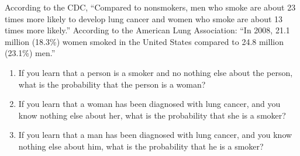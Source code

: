 \documentclass[twoside]{book}\usepackage[]{graphicx}\usepackage[]{xcolor}
\begin{document}
\begin{problem}
According to the CDC, ``Compared to nonsmokers, men who smoke are about 23
times more likely to develop lung cancer and women who smoke are about 13 times
more likely.''  According to the American Lung Association: 
``In 2008, 21.1 million (18.3\%) women smoked in the United States 
compared to 24.8 million (23.1\%) men.''

\begin{enumerate}
	\item
		If you learn that a person is a smoker and no nothing else 
		about the person, what is the probability that the person is a woman?
	\item
		If you learn that a woman has been diagnosed with lung cancer,
		and you know nothing else about her, what is the probability that she is a
		smoker?
	\item
		If you learn that a man has been diagnosed with lung cancer,
		and you know nothing else about him, what is the probability that he is a
		smoker?
\end{enumerate}
\end{problem}
\end{document}
